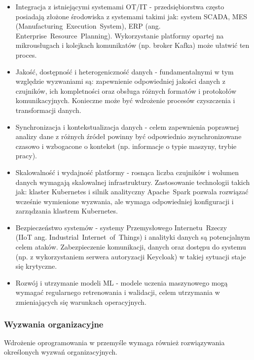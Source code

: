 \begin{itemize}
    \item Integracja z istniejącymi systemami OT/IT - przedsiębiorstwa często posiadają złożone środowiska z systemami takimi jak: system SCADA, MES (\mbox{Manufacturing Execution System}), ERP (ang. \mbox{Enterprise Resource Planning}). Wykorzystanie platformy opartej na mikrousługach i kolejkach komunikatów (np. broker Kafka) może ułatwić ten proces.
    \item Jakość, dostępność i heterogeniczność danych - fundamentalnymi w tym względzie wyzwaniami są:  zapewnienie odpowiedniej jakości danych z czujników, ich kompletności oraz obsługa różnych formatów i protokołów komunikacyjnych. Konieczne może być wdrożenie procesów czyszczenia i transformacji danych.
    \item Synchronizacja i kontekstualizacja danych - celem zapewnienia poprawnej analizy dane z różnych źródeł powinny być odpowiednio zsynchronizowane czasowo i wzbogacone o kontekst (np. informacje o typie maszyny, trybie pracy).
    \item Skalowalność i wydajność platformy - rosnąca liczba czujników i wolumen danych wymagają skalowalnej infrastruktury. Zastosowanie technologii takich jak: klaster Kubernetes i silnik analityczny \mbox{Apache Spark} pozwala rozwiązać wcześnie wymienione wyzwania, ale wymaga odpowiedniej konfiguracji i zarządzania klastrem Kubernetes.
    \item Bezpieczeństwo systemów - systemy Przemysłowego \mbox{Internetu Rzeczy} \\ (\mbox{IIoT} ang. \mbox{Industrial Internet of Things}) i analityki danych są potencjalnym celem ataków. Zabezpieczenie komunikacji, danych oraz dostępu do systemu (np. z wykorzystaniem serwera autoryzacji Keycloak) w takiej sytuacji staje się krytyczne.
    \item Rozwój i utrzymanie modeli ML - modele uczenia maszynowego mogą wymagać regularnego retrenowania i walidacji, celem utrzymania w zmieniających się warunkach operacyjnych.
\end{itemize}

\subsubsection{Wyzwania organizacyjne}
\label{subsubsec:wyzwania_organizacyjne}

Wdrożenie oprogramowania w przemyśle wymaga również rozwiązywania określonych wyzwań organizacyjnych.

